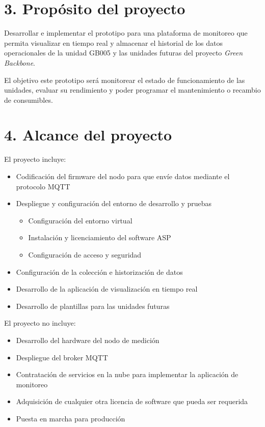 \documentclass[
11pt, %
]{charter}
\begin{document}
\section{3. Propósito del proyecto}
\label{sec:proposito}

Desarrollar e implementar el prototipo para una plataforma de monitoreo que permita visualizar en tiempo real y almacenar el historial de los datos operacionales de la unidad GB005 y las unidades futuras del proyecto \textit{Green Backbone}. 

El objetivo este prototipo será monitorear el estado de funcionamiento de las unidades, evaluar su rendimiento y poder programar el mantenimiento o recambio de consumibles.

\section{4. Alcance del proyecto}
\label{sec:alcance}
El proyecto incluye:
\begin{itemize}
	\item Codificación del firmware del nodo para que envíe datos mediante el protocolo MQTT
	\item Despliegue y configuración del entorno de desarrollo y pruebas
		\begin{itemize}
		\item Configuración del entorno virtual
		\item Instalación y licenciamiento del software ASP
		\item Configuración de acceso y seguridad
		\end{itemize}
	\item Configuración de la colección e historización de datos
	\item Desarrollo de la aplicación de visualización en tiempo real
	\item Desarrollo de plantillas para las unidades futuras
	
\end{itemize}

El proyecto no incluye:
\begin{itemize}
	\item Desarrollo del hardware del nodo de medición
	\item Despliegue del broker MQTT
	\item Contratación de servicios en la nube para implementar la aplicación de monitoreo
	\item Adquisición de cualquier otra licencia de software que pueda ser requerida
	\item Puesta en marcha para producción
	
\end{itemize}
\end{document}
